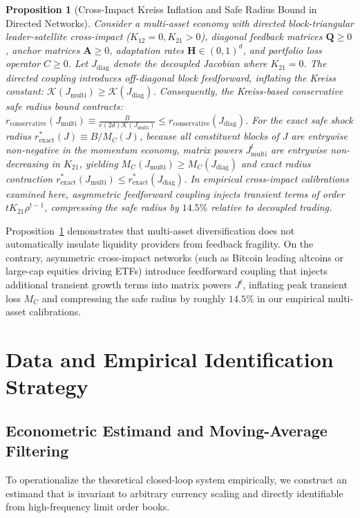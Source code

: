 \documentclass[12pt]{article}
\newtheorem{proposition}[theorem]{Proposition}
\theoremstyle{definition}
\theoremstyle{remark}
\begin{document}
\begin{proposition}[Cross-Impact Kreiss Inflation and Safe Radius Bound in Directed Networks]
\label{prop:cross_kreiss}
Consider a multi-asset economy with directed block-triangular leader-satellite cross-impact ($K_{12} = 0, K_{21} > 0$), diagonal feedback matrices $\mathbf{Q} \ge 0$, anchor matrices $\mathbf{A} \ge 0$, adaptation rates $\mathbf{H} \in (0, 1)^d$, and portfolio loss operator $C \ge 0$. Let $J_{\text{diag}}$ denote the decoupled Jacobian where $K_{21} = 0$.
The directed coupling introduces off-diagonal block feedforward, inflating the Kreiss constant: $\mathcal{K}(J_{\text{multi}}) \ge \mathcal{K}(J_{\text{diag}})$. Consequently, the Kreiss-based conservative safe radius bound contracts: $r_{\text{conservative}}(J_{\text{multi}}) \equiv \frac{B}{e (2d) \mathcal{K}(J_{\text{multi}})} \le r_{\text{conservative}}(J_{\text{diag}})$.
For the exact safe shock radius $r^*_{\text{exact}}(J) \equiv B / M_C(J)$, because all constituent blocks of $J$ are entrywise non-negative in the momentum economy, matrix powers $J_{\text{multi}}^t$ are entrywise non-decreasing in $K_{21}$, yielding $M_C(J_{\text{multi}}) \ge M_C(J_{\text{diag}})$ and exact radius contraction $r^*_{\text{exact}}(J_{\text{multi}}) \le r^*_{\text{exact}}(J_{\text{diag}})$. In empirical cross-impact calibrations examined here, asymmetric feedforward coupling injects transient terms of order $t K_{21} \rho^{t-1}$, compressing the safe radius by $14.5\%$ relative to decoupled trading.
\end{proposition}

Proposition~\ref{prop:cross_kreiss} demonstrates that multi-asset diversification does not automatically insulate liquidity providers from feedback fragility. On the contrary, asymmetric cross-impact networks (such as Bitcoin leading altcoins or large-cap equities driving ETFs) introduce feedforward coupling that injects additional transient growth terms into matrix powers $J^t$, inflating peak transient loss $M_C$ and compressing the safe radius by roughly $14.5\%$ in our empirical multi-asset calibrations.

\section{Data and Empirical Identification Strategy}
\label{sec:data_estimand}

\subsection{Econometric Estimand and Moving-Average Filtering}
To operationalize the theoretical closed-loop system empirically, we construct an estimand that is invariant to arbitrary currency scaling and directly identifiable from high-frequency limit order books.
\end{document}
